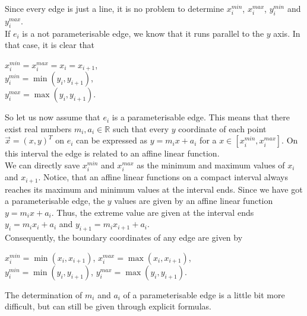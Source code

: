 \documentclass[a4paper,12pt,leqno]{article}
\theoremstyle{plain}
\theoremstyle{remark}
\newcommand{\R}{\mathbb{R}}
\begin{document}
Since every edge is just a line, it is no problem to determine $x_{i}^{min}$, $x_{i}^{max}$, $y_{i}^{min}$ and $y_{i}^{max}$. \\
If $e_i$ is a not parameterisable edge, we know that it runs parallel to the $y$ axis. In that case, it is clear that 
\begin{center}
	$x_{i}^{min} = x_{i}^{max} = x_i = x_{i+1} $, \\ \smallskip
	$y_{i}^{min} = \min(y_i, y_{i+1}) $, \\ \smallskip
	$y_{i}^{max} = \max(y_i, y_{i+1})$.
\end{center}
So let us now assume that $e_i$ is a parameterisable edge. This means that there exist real numbers $m_i, a_i \in \R$ such that every $y$ coordinate of each point $\vec{x} = (x,y)^T$ on $e_i$ can be expressed as $y = m_i x + a_i$ for a $x \in [x_{i}^{min}, x_{i}^{max}].$ On this interval the edge is related to an affine linear function. \\
We can directly save $x_{i}^{min}$ and $x_{i}^{max}$ as the minimum and maximum values of $x_i$ and $x_{i+1}$. 
Notice, that an affine linear functions on a compact interval always reaches its maximum and minimum values at the interval ends. 
Since we have got a parameterisable edge, the $y$ values are given by an affine linear function $y = m_i x + a_i$. Thus, the extreme value are given at the interval ends $y_i = m_i x_i + a_i $ and $y_{i+1} = m_i x_{i+1} + a_i$.\\
Consequently, the boundary coordinates of any edge are given by	
\begin{center}
	$x_{i}^{min} = \min(x_i, x_{i+1}) $, \qquad
	$x_{i}^{max} = \max(x_i, x_{i+1}) $, \\ \smallskip
	$y_{i}^{min} = \min(y_i, y_{i+1}) $, \qquad
	$y_{i}^{max} = \max(y_i, y_{i+1}) $. \\
\end{center}
The determination of $m_i$ and $a_i$ of a parameterisable edge is a little bit more difficult, but can still be given through explicit formulas. \\
\end{document}
